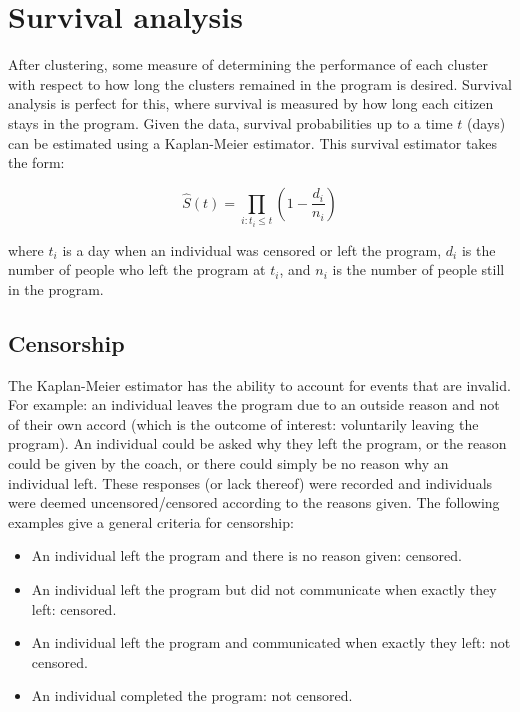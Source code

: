 \documentclass[12pt]{article}
\begin{document}

\section{Survival analysis}
		
		After clustering, some measure of determining the performance of each cluster with respect to how long the clusters remained in the program is desired. Survival analysis is perfect for this, where survival is measured by how long each citizen stays in the program. Given the data, survival probabilities up to a time $t$ (days) can be estimated using a Kaplan-Meier estimator. This survival estimator takes the form:
		
		$$
		\widehat{S}(t) = \prod_{i: t_i \leq t} \left( 1 - \frac{d_i}{n_i} \right)
		$$
		
		where $t_i$ is a day when an individual was censored or left the program, $d_i$ is the number of people who left the program at $t_i$, and $n_i$ is the number of people still in the program.
		
		
		
		\subsection{Censorship}
		
		The Kaplan-Meier estimator has the ability to account for events that are invalid. For example: an individual leaves the program due to an outside reason and not of their own accord (which is the outcome of interest: voluntarily leaving the program). An individual could be asked why they left the program, or the reason could be given by the coach, or there could simply be no reason why an individual left. These responses (or lack thereof) were recorded and individuals were deemed uncensored/censored according to the reasons given. The following examples give a general criteria for censorship:
		\begin{itemize}
			\item An individual left the program and there is no reason given: censored.
			\item An individual left the program but did not communicate when exactly they left: censored.
			\item An individual left the program and communicated when exactly they left: not censored.
			\item An individual completed the program: not censored.
		\end{itemize}
		
\end{document}
